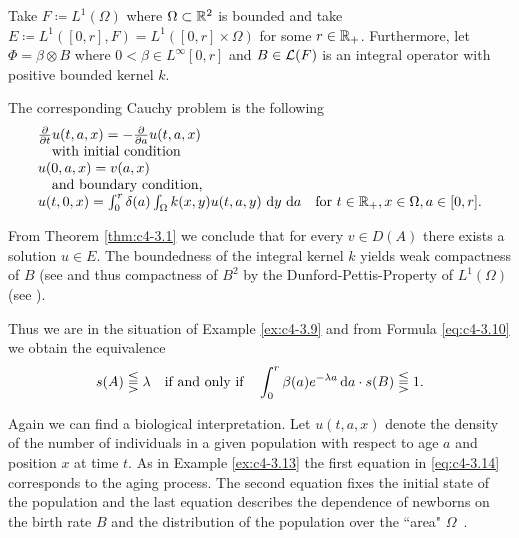 \begin{example}\label{ex:c4-3.13}
Take $F \coloneqq L^{1}(\Omega)$ where $\Omega \subset \mathbb{R}^{2}$ is bounded and take \\ $E \coloneqq L^{1}([0,r], F) = L^{1}([0,r] \times \Omega)$ for some $r \in \mathbb{R}_{+}$.
Furthermore, let $\Phi = \beta \otimes B$ where $0 < \beta \in L^{\infty}[0,r]$ and $B \in \mathcal{L}(F)$ is an integral operator with positive bounded kernel $k$.

The corresponding Cauchy problem is the following
\begin{equation}\label{eq:c4-3.14}
\begin{array}{l}
\frac{\partial}{\partial t}u(t,a,x) = - \frac{\partial}{\partial a} u(t,a,x) \\
\quad \text{with initial condition} \\ 
u(0,a,x) = v(a,x)\\
\quad \text{and boundary condition,} \\
u(t,0,x) = \int_{0}^{r} \delta(a) \int_{\Omega} k(x,y) u(t,a,y) \, \mathop{}\!\mathrm{d}{y} \, \mathop{}\!\mathrm{d}{a} \quad \text{for } t \in \mathbb{R}_{+}, x \in \Omega, a \in [0,r].
\end{array}
\end{equation}

From Theorem \ref{thm:c4-3.1} we conclude that for every $v \in D(A)$ there exists a solution $u \in E$.
The boundedness of the integral kernel $k$ yields weak compactness of $B$ (see \citet[Section II.5]{schaefer:1974} and thus compactness of $B^{2}$ by the Dunford-Pettis-Property of $L^{1}(\Omega)$ (see \citet[Chapter II, Theorem.9.9]{schaefer:1974}).

Thus we are in the situation of Example \ref{ex:c4-3.9} and from Formula \eqref{eq:c4-3.10} we obtain the equivalence
\[
s(A) \lesseqqgtr \lambda \quad \text{if and only if} \quad \int_{0}^{r} \beta(a)e^{-\lambda a} \mathop{}\!\mathrm{d}{a} \cdot s(B) \lesseqqgtr 1 .
\]
\end{example}

Again we can find a biological interpretation.
Let $u(t,a,x)$ denote the density of the number of individuals in a given population with respect to age $a$ and position $x$ at time $t$.
As in Example \ref{ex:c4-3.13} the first equation in \eqref{eq:c4-3.14} corresponds to the aging process.
The second equation fixes the initial state of the population and the last equation describes the dependence of newborns on the birth rate $B$ and the distribution of the population over the ``area" $\Omega$\, .


